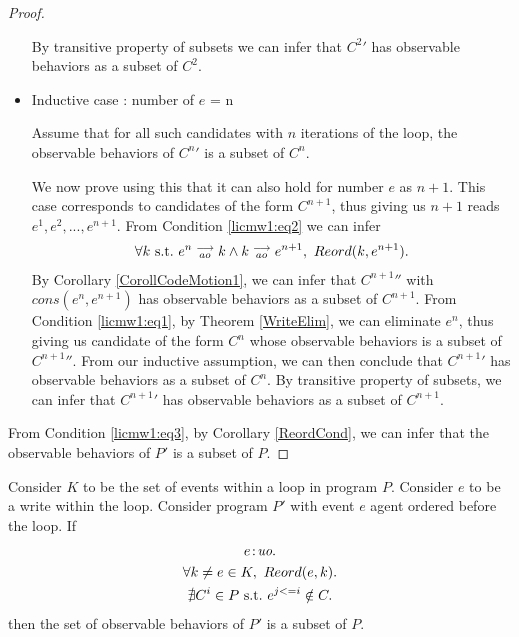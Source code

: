 \begin{proof}
\begin{itemize}
        By transitive property of subsets we can infer that $C^{2}'$ has observable behaviors as a subset of $C^2$.
        
        \item Inductive case : number of $e$ = n

        Assume that for all such candidates with $n$ iterations of the loop, the observable behaviors of $C^{n}'$ is a subset of $C^n$.

        We now prove using this that it can also hold for number $e$ as $n + 1$. 
        This case corresponds to candidates of the form $C^{n+1}$, thus giving us $n+1$ reads $e^1, e^2,...,e^{n+1}$.
        From Condition \ref{licmw1:eq2} we can infer 
        \begin{align*}
            \forall k \ \text{s.t.} \ e^n\stackrel{\longrightarrow}{_{ao}}k \wedge k\stackrel{\longrightarrow}{_{ao}}e^{n+1}, \ Reord(k,e^{n+1}).
        \end{align*}
        By Corollary \ref{CorollCodeMotion1}, we can infer that $C^{n+1}''$ with $cons(e^n, e^{n+1})$ has observable behaviors as a subset of $C^{n+1}$. 
        From Condition \ref{licmw1:eq1}, by Theorem \ref{WriteElim}, we can eliminate $e^{n}$, thus giving us candidate of the form $C^n$ whose observable behaviors is a subset of $C^{n+1}''$.
        From our inductive assumption, we can then conclude that $C^{n+1}'$ has observable behaviors as a subset of $C^n$. 
        By transitive property of subsets, we can infer that $C^{n+1}'$ has observable behaviors as a subset of $C^{n+1}$.

    \end{itemize}

    From Condition \ref{licmw1:eq3}, by Corollary \ref{ReordCond}, we can infer that the observable behaviors of $P'$ is a subset of $P$.

\end{proof}


\begin{corollary}
    \label{LoopInvCodeMotWrite2}
    Consider $K$ to be the set of events within a loop in program $P$. 
    Consider $e$ to be a write within the loop. 
    Consider program $P'$ with event $e$ agent ordered before the loop. 
    If
    \begin{gather*}
        e\!:\!\textit{uo}. \label{licmw2:eq1}\\
        \forall k \neq e \in K, \ Reord(e, k). \label{licmw2:eq2}\\ 
        \nexists C^i \in P \ \text{s.t.} \ e^{j<=i} \notin C.  \label{licmw2:eq3}                    
    \end{gather*}
    then the set of observable behaviors of $P'$ is a subset of $P$.

\end{corollary}             

